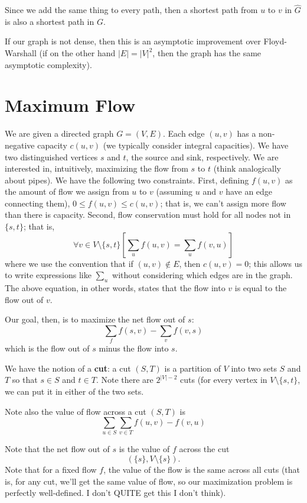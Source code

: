 \documentclass{article}
\begin{document}
Since we add the same thing to every path, then a shortest path from
$u$ to $v$ in $\widehat G$ is also a shortest path in $G$.

If our graph is not dense, then this is an asymptotic improvement over
Floyd-Warshall (if on the other hand $|E| = |V|^2$, then the graph
has the same asymptotic complexity).


\section{Maximum Flow}

We are given a directed graph $G=(V,E)$.
Each edge $(u,v)$ has a non-negative capacity $c(u,v)$ (we typically
consider integral capacities).
We have two distinguished vertices $s$ and $t$, the source and sink, 
respectively.
We are interested in, intuitively, maximizing the flow from $s$ to $t$
(think analogically about pipes).
We have the following two constraints.
First, defining $f(u,v)$ as the amount of flow we assign from $u$ to $v$
(assuming $u$ and $v$ have an edge connecting them), 
$0\leq f(u,v) \leq c(u,v)$; that is, we can't assign more flow than there
is capacity.
Second, flow conservation must hold for all nodes not in $\{s,t\}$; that is,
$$
\forall v\in V\setminus \{s,t\}
\left[
	\sum_u f(u,v) = \sum_u f(v,u)
\right]
$$
where we use the convention that if $(u,v)\not\in E$, then $c(u,v) = 0$;
this allows us to write expressions like $\sum_u$ without considering
which edges are in the graph.
The above equation, in other words, states that the flow into $v$
is equal to the flow out of $v$.

Our goal, then, is to maximize the net flow out of $s$:
$$
\sum_f f(s,v) - \sum_v f(v,s)
$$
which is the flow out of $s$ minus the flow into $s$.

We have the notion of a \textbf{cut}: a cut $(S,T)$ is a partition of
$V$ into two sets $S$ and $T$ so that $s\in S$ and $t\in T$.
Note there are $2^{|V| - 2}$ cuts (for every vertex in $V\setminus \{s,t\}$,
we can put it in either of the two sets.

Note also the value of flow across a cut $(S,T)$ is
$$
\sum_{u\in S} \sum_{v\in T}
	f(u,v) - f(v,u)
$$

Note that the net flow out of $s$ is the value of $f$ across the cut
$$
\left(\{s\}, V\setminus \{s\}\right).
$$
Note that for a fixed flow $f$, the value of the flow is the same
across all cuts (that is, for any cut, we'll get the same value of flow,
so our maximization problem is perfectly well-defined. I don't QUITE get
this I don't think).
\end{document}
